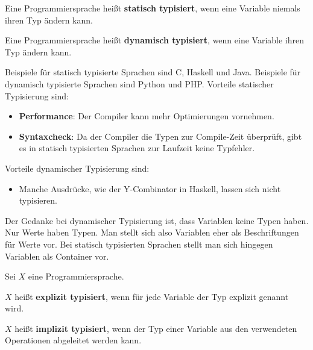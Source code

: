 \begin{definition}%
    \begin{defenum}
        \item Eine Programmiersprache heißt \textbf{statisch typisiert}, wenn eine 
              Variable niemals ihren Typ ändern kann.
        \item Eine Programmiersprache heißt \textbf{dynamisch typisiert}, wenn eine 
              Variable ihren Typ ändern kann.
    \end{defenum}
\end{definition}

Beispiele für statisch typisierte Sprachen sind C, Haskell und Java.
Beispiele für dynamisch typisierte Sprachen sind Python und PHP.
\goodbreak
Vorteile statischer Typisierung sind:

\begin{itemize}
    \item \textbf{Performance}: Der Compiler kann mehr Optimierungen vornehmen.
    \item \textbf{Syntaxcheck}: Da der Compiler die Typen zur Compile-Zeit überprüft,
                                gibt es in statisch typisierten Sprachen zur
                                Laufzeit keine Typfehler.
\end{itemize}

Vorteile dynamischer Typisierung sind:

\begin{itemize}
    \item Manche Ausdrücke, wie der Y-Combinator in Haskell, lassen sich nicht
          typisieren.
\end{itemize}

Der Gedanke bei dynamischer Typisierung ist, dass Variablen keine Typen haben.
Nur Werte haben Typen. Man stellt sich also Variablen eher als Beschriftungen für
Werte vor. Bei statisch typisierten Sprachen stellt man sich hingegen Variablen
als Container vor.

\begin{definition}%
    Sei $X$ eine Programmiersprache.
    \begin{defenum}
        \item $X$ heißt \textbf{explizit typisiert}, wenn für jede 
              Variable der Typ explizit genannt wird.
        \item $X$ heißt \textbf{implizit typisiert}, wenn der Typ einer
              Variable aus den verwendeten Operationen abgeleitet werden kann.
    \end{defenum}
\end{definition}

